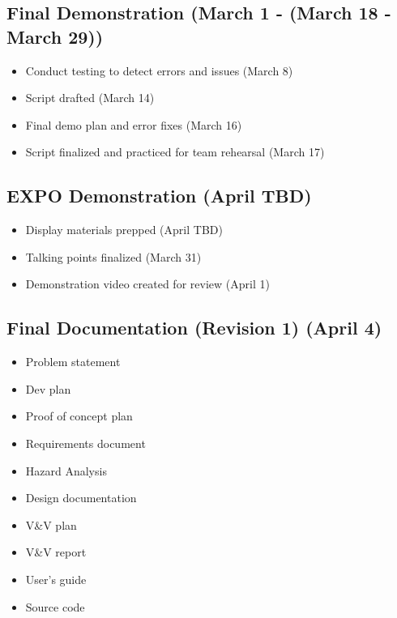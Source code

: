 \documentclass{article}
\begin{document}
	\subsection{Final Demonstration (March 1 - (March 18 - March 29))}
	\begin{itemize}
		\item Conduct testing to detect errors and issues (March 8)
		\item Script drafted (March 14)
		\item Final demo plan and error fixes (March 16)
		\item Script finalized and practiced for team rehearsal (March 17)
	\end{itemize}

	\subsection{EXPO Demonstration (April TBD)}
	\begin{itemize}
		\item Display materials prepped (April TBD)
		\item Talking points finalized (March 31)
		\item Demonstration video created for review (April 1)
	\end{itemize}

	\subsection{Final Documentation (Revision 1) (April 4)}
	\begin{itemize}
		\item Problem statement
		\item Dev plan
		\item Proof of concept plan
		\item Requirements document
		\item Hazard Analysis
		\item Design documentation
		\item V\&V plan
		\item V\&V report
		\item User’s guide
		\item Source code
	\end{itemize}
\end{document}
